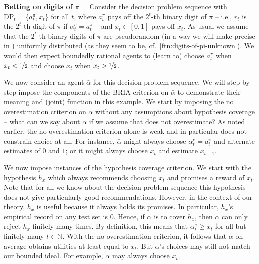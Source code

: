 \documentclass[submission,copyright,creativecommons]{eptcs}
\begin{document}
\textbf{Betting on digits of $\pi$~~}
Consider the decision problem sequence with $\mathrm{DP}_t=\{a_t^{\pi},x_t \}$ for all $t$, where $a_t^{\pi}$ pays off the $2^t$-th binary digit of $\pi$ -- i.e., $r_t$ is the $2^t$-th digit of $\pi$ if $\alpha_t^c=a_t^{\pi}$ -- and $x_t\in [0,1]$ pays off $x_t$. As usual we assume that the $2^t$-th binary digits of $\pi$ are pseudorandom (in a way we will make precise in ) uniformly distributed (as they seem to be, cf.\ \cref{ftn:digits-of-pi-unknown}).
We would then expect boundedly rational agents to (learn to) choose $a_t^{\pi}$ when $x_t<\nicefrac{1}{2}$ and choose $x_t$ when $x_t>\nicefrac{1}{2}$.

We now consider an agent $\bar\alpha$ for this decision problem sequence. We will step-by-step impose the components of the BRIA criterion on $\bar\alpha$ to demonstrate their meaning and (joint) function in this example. We start by imposing the no overestimation criterion on $\bar\alpha$ without any assumptions about hypothesis coverage -- what can we say about $\bar\alpha$ if we assume that does not overestimate? As noted earlier, the no overestimation criterion alone is weak and in particular does not constrain choice at all. For instance, $\bar\alpha$ might always choose $\alpha^c_t=a_t^{\pi}$ and alternate estimates of $0$ and $1$; or it might always choose $x_t$ and estimate $x_{t-1}$.

We now impose instances of the hypothesis coverage criterion. We start with the hypothesis $ h_x$ which always recommends choosing $x_t$ and promises a reward of $x_t$. Note that for all we know about the decision problem sequence this hypothesis does not give particularly good recommendations. However, in the context of our theory, $h_x$ is useful because it always holds its promises. In particular, $h_x$'s empirical record on any test set is $0$. Hence, if $\alpha$ is to cover $h_x$, then $\alpha$ can only reject $h_x$ finitely many times. By definition, this means that $\alpha_t^e\geq x_t$ for all but finitely many $t\in \mathbb{N}$.
With the no overestimation criterion, it follows that $\alpha$ on average obtains utilities at least equal to $x_t$. But $\alpha$'s choices may still not match our bounded ideal. For example, $\alpha$ may always choose $x_t$.
\end{document}
